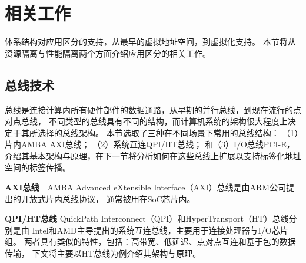

\section{相关工作}

体系结构对应用区分的支持，从最早的虚拟地址空间，到虚拟化支持。
本节将从资源隔离与性能隔离两个方面介绍应用区分的相关工作。


\subsection{总线技术}

总线是连接计算内所有硬件部件的数据通路，从早期的并行总线，到现在流行的点对点总线，
不同类型的总线具有不同的结构，而计算机系统的架构很大程度上决定于其所选择的总线架构。
本节选取了三种在不同场景下常用的总线结构：
（1）片内AMBA AXI总线；
（2）系统互连QPI/HT总线；
和（3）I/O总线PCI-E，
介绍其基本架构与原理，在下一节将分析如何在这些总线上扩展以支持标签化地址空间的标签传播。

\textbf{AXI总线}　AMBA Advanced eXtensible Interface（AXI）总线是由ARM公司提出的开放式片内总线协议，
通常被用在SoC芯片内。

\textbf{QPI/HT总线} QuickPath Interconnect（QPI）和HyperTransport（HT）总线分别是由
Intel和AMD主导提出的系统互连总线，主要用于连接处理器与I/O芯片组。
两者具有类似的特性，包括：高带宽、低延迟、点对点互连和基于包的数据传输，
下文将主要以HT总线为例介绍其架构与原理。

